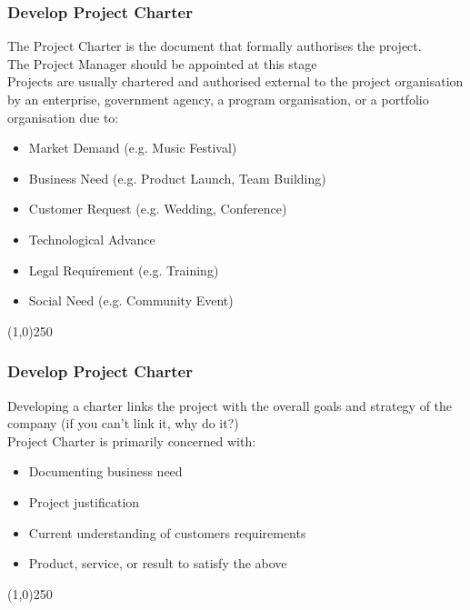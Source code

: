\begin{frame}
\frametitle{Develop Project Charter}
The Project Charter is the document that formally authorises the project.\\
The Project Manager should be appointed at this stage\\
Projects are usually chartered and authorised external to the project organisation by an enterprise, government agency, a program organisation, or a portfolio organisation due to:
\begin{itemize}
	\item Market Demand (e.g. Music Festival)
	\item Business Need (e.g. Product Launch, Team Building)
	\item Customer Request (e.g. Wedding, Conference)
	\item Technological Advance
	\item Legal Requirement (e.g. Training)
	\item Social Need (e.g. Community Event)
\end{itemize}
\end{frame}\begin{center}\line(1,0){250}\end{center}
%
%
\begin{frame}
\frametitle{Develop Project Charter}
Developing a charter links the project with the overall goals and strategy of the company (if you can't link it, why do it?)\\
Project Charter is primarily concerned with:
\begin{itemize}
	\item Documenting business need
	\item Project justification
	\item Current understanding of customers requirements
	\item Product, service, or result to satisfy the above
\end{itemize}
\end{frame}\begin{center}\line(1,0){250}\end{center}
%
%

